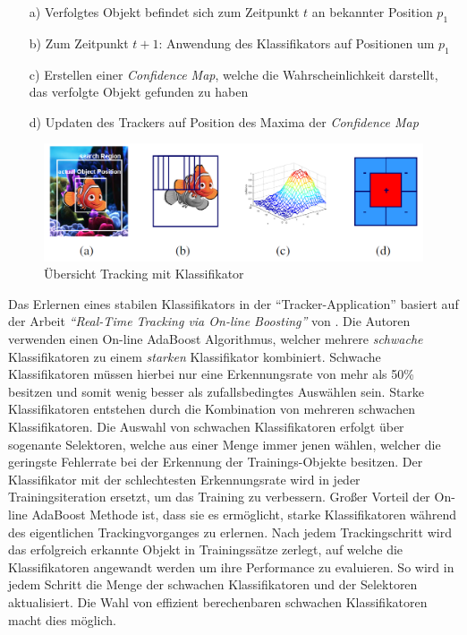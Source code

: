 \begin{itemize}
    \item[a)] Verfolgtes Objekt befindet sich zum Zeitpunkt $t$ an bekannter Position $p_1$
    \item[b)] Zum Zeitpunkt $t+1$: Anwendung des Klassifikators auf Positionen um $p_1$
    \item[c)] Erstellen einer \textit{Confidence Map}, welche die Wahrscheinlichkeit darstellt,
                das verfolgte Objekt gefunden zu haben
    \item[d)] Updaten des Trackers auf Position des Maxima der \textit{Confidence Map}
\end{itemize}

\begin{figure}[H]
    \centering
    \includegraphics[width=0.7\linewidth]{../resources/img/grundlagen/tracking}
    \caption[Übersicht Tracking mit Klassifikator]{Übersicht Tracking mit Klassifikator \cite[]{Grabner}}
    \label{fig:grund_tracking}
\end{figure}

Das Erlernen eines stabilen Klassifikators in der ``Tracker-Application'' basiert auf der Arbeit
\textit{``Real-Time Tracking via On-line Boosting''} von \cite[]{Grabner}.
Die Autoren verwenden einen On-line AdaBoost Algorithmus, welcher mehrere \textit{schwache}
Klassifikatoren zu einem \textit{starken} Klassifikator kombiniert.
Schwache Klassifikatoren müssen hierbei nur eine Erkennungsrate von mehr als 50\% besitzen und somit
wenig besser als zufallsbedingtes Auswählen sein.
Starke Klassifikatoren entstehen durch die Kombination von mehreren schwachen Klassifikatoren.
Die Auswahl von schwachen Klassifikatoren erfolgt über sogenante Selektoren, welche aus einer Menge
immer jenen wählen, welcher die geringste Fehlerrate bei der Erkennung
der Trainings-Objekte besitzen. Der Klassifikator mit der schlechtesten Erkennungsrate wird in jeder
Trainingsiteration ersetzt, um das Training zu verbessern.
Großer Vorteil der On-line AdaBoost Methode ist, dass sie es ermöglicht, starke Klassifikatoren während des
eigentlichen Trackingvorganges zu erlernen. Nach jedem Trackingschritt wird das erfolgreich erkannte
Objekt in Trainingssätze zerlegt, auf welche die Klassifikatoren angewandt werden um ihre Performance zu evaluieren.
So wird in jedem Schritt die Menge der schwachen Klassifikatoren und der Selektoren aktualisiert. Die Wahl
von effizient berechenbaren schwachen Klassifikatoren macht dies möglich.


